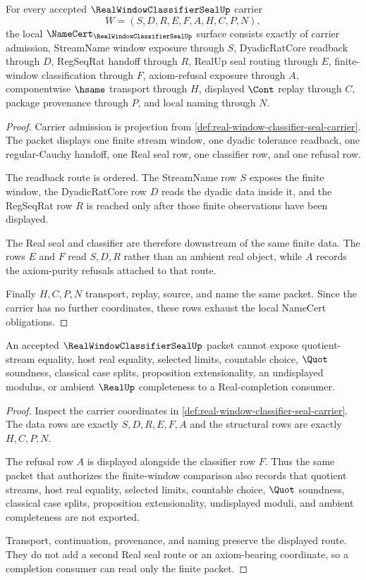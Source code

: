 \begin{theorem}
\label{thm:real-window-classifier-seal-namecert-obligations}
For every accepted $\RealWindowClassifierSealUp$ carrier
$$
W=(S,D,R,E,F,A,H,C,P,N),
$$
the local $\NameCert_{\RealWindowClassifierSealUp}$ surface consists exactly of carrier admission, StreamName window exposure through $S$, DyadicRatCore readback through $D$, RegSeqRat handoff through $R$, RealUp seal routing through $E$, finite-window classification through $F$, axiom-refusal exposure through $A$, componentwise $\hsame$ transport through $H$, displayed $\Cont$ replay through $C$, package provenance through $P$, and local naming through $N$.
\end{theorem}
\begin{proof}
Carrier admission is projection from \autoref{def:real-window-classifier-seal-carrier}. The packet displays one finite stream window, one dyadic tolerance readback, one regular-Cauchy handoff, one Real seal row, one classifier row, and one refusal row.

The readback route is ordered. The StreamName row $S$ exposes the finite window, the DyadicRatCore row $D$ reads the dyadic data inside it, and the RegSeqRat row $R$ is reached only after those finite observations have been displayed.

The Real seal and classifier are therefore downstream of the same finite data. The rows $E$ and $F$ read $S,D,R$ rather than an ambient real object, while $A$ records the axiom-purity refusals attached to that route.

Finally $H,C,P,N$ transport, replay, source, and name the same packet. Since the carrier has no further coordinates, these rows exhaust the local NameCert obligations.
\end{proof}

\begin{theorem}
\label{thm:real-window-classifier-seal-nonescape}
An accepted $\RealWindowClassifierSealUp$ packet cannot expose quotient-stream equality, host real equality, selected limits, countable choice, $\Quot$ soundness, classical case splits, proposition extensionality, an undisplayed modulus, or ambient $\RealUp$ completeness to a Real-completion consumer.
\end{theorem}
\begin{proof}
Inspect the carrier coordinates in \autoref{def:real-window-classifier-seal-carrier}. The data rows are exactly $S,D,R,E,F,A$ and the structural rows are exactly $H,C,P,N$.

The refusal row $A$ is displayed alongside the classifier row $F$. Thus the same packet that authorizes the finite-window comparison also records that quotient streams, host real equality, selected limits, countable choice, $\Quot$ soundness, classical case splits, proposition extensionality, undisplayed moduli, and ambient completeness are not exported.

Transport, continuation, provenance, and naming preserve the displayed route. They do not add a second Real seal route or an axiom-bearing coordinate, so a completion consumer can read only the finite packet.
\end{proof}

